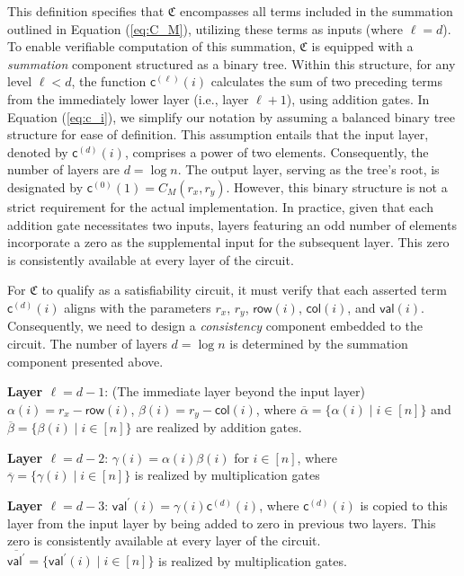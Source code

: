This definition specifies that $\mathfrak{C}$ encompasses all terms included in the summation outlined in Equation (\ref{eq:C_M}), utilizing these terms as inputs (where $\ell = d$). To enable verifiable computation of this summation, $\mathfrak{C}$ is equipped with a \textit{summation} component structured as a binary tree. Within this structure, for any level $\ell < d$, the function $\mathsf{c}^{(\ell)}(i)$ calculates the sum of two preceding terms from the immediately lower layer (i.e., layer $\ell+1$), using addition gates. In Equation (\ref{eq:c_i}), we simplify our notation by assuming a balanced binary tree structure for ease of definition. This assumption entails that the input layer, denoted by $\mathsf{c}^{(d)}(i)$, comprises a power of two elements. Consequently, the number of layers are $d = \log{n}$. The output layer, serving as the tree's root, is designated by $\mathsf{c}^{(0)}(1) = C_M(r_x, r_y)$. However, this binary structure is not a strict requirement for the actual implementation. In practice, given that each addition gate necessitates two inputs, layers featuring an odd number of elements incorporate a zero as the supplemental input for the subsequent layer. This zero is consistently available at every layer of the circuit.


For $\mathfrak{C}$ to qualify as a satisfiability circuit, it must verify that each asserted term $\mathsf{c}^{(d)}(i)$ aligns with the parameters $r_x$, $r_y$, $\mathsf{row}(i)$, $\mathsf{col}(i)$, and $\mathsf{val}(i)$. Consequently, we need to design a \textit{consistency} component embedded to the circuit. The number of layers $d = \log{n}$ is determined by the summation component presented above. 

\noindent\textbf{Layer  $\ell = d-1$}: (The immediate layer beyond the input layer) $\alpha(i) = r_x - \mathsf{row}(i)$, $\beta(i) = r_y - \mathsf{col}(i)$, where $\overline{\alpha}=\{\alpha(i) \mid i \in [n]\}$ and $\overline{\beta}=\{\beta(i) \mid i \in [n]\}$ are realized by addition gates.

\noindent\textbf{Layer  $\ell = d-2$}: $\gamma(i) = \alpha(i)\beta(i)$ for $i \in [n]$, where $\overline{\gamma}=\{\gamma(i) \mid i \in [n]\}$ is realized by multiplication gates

\noindent\textbf{Layer  $\ell = d-3$}: $\mathsf{val}^\prime(i) = \gamma(i)\mathsf{c}^{(d)}(i)$, where $\mathsf{c}^{(d)}(i)$ is  copied to this layer from the input layer by being added to zero in previous two layers. This zero is consistently available at every layer of the circuit. $\overline{\mathsf{val}^\prime}=\{\mathsf{val}^\prime(i) \mid i \in [n]\}$ is realized by multiplication gates.

